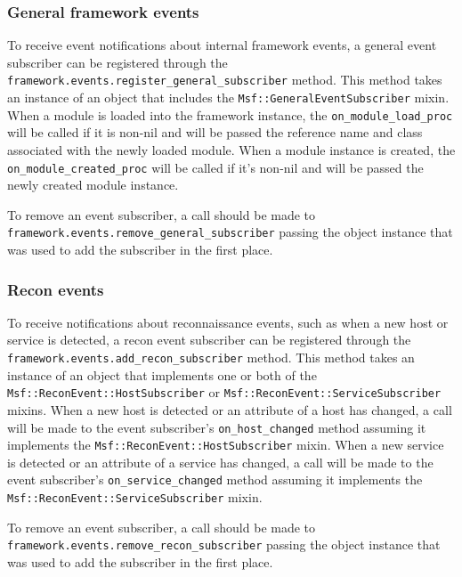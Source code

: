 \documentclass{report}
\begin{document}
            \subsubsection{General framework events}

\par
To receive event notifications about internal framework events, a
general event subscriber can be registered through the
\texttt{framework.events.register\_general\_subscriber} method.
This method takes an instance of an object that includes the
\texttt{Msf::GeneralEventSubscriber} mixin.  When a module is loaded
into the framework instance, the \texttt{on\_module\_load\_proc}
will be called if it is non-nil and will be passed the reference
name and class associated with the newly loaded module. When a
module instance is created, the \texttt{on\_module\_created\_proc}
will be called if it's non-nil and will be passed the newly created
module instance.

\par
To remove an event subscriber, a call should be made to\\
\texttt{framework.events.remove\_general\_subscriber} passing the
object instance that was used to add the subscriber in the first
place.
            \subsubsection{Recon events}

\par
To receive notifications about reconnaissance events, such as when a
new host or service is detected, a recon event subscriber can be
registered through the
\texttt{framework.events.add\_recon\_subscriber} method.  This
method takes an instance of an object that implements one or both of
the \texttt{Msf::ReconEvent::HostSubscriber} or
\texttt{Msf::ReconEvent::ServiceSubscriber} mixins.  When a new host
is detected or an attribute of a host has changed, a call will be
made to the event subscriber's \texttt{on\_host\_changed} method
assuming it implements the \texttt{Msf::ReconEvent::HostSubscriber}
mixin.  When a new service is detected or an attribute of a service
has changed, a call will be made to the event subscriber's
\texttt{on\_service\_changed} method assuming it implements the
\texttt{Msf::ReconEvent::ServiceSubscriber} mixin.

\par
To remove an event subscriber, a call should be made to\\
\texttt{framework.events.remove\_recon\_subscriber} passing the
object instance that was used to add the subscriber in the first
place.
\end{document}
